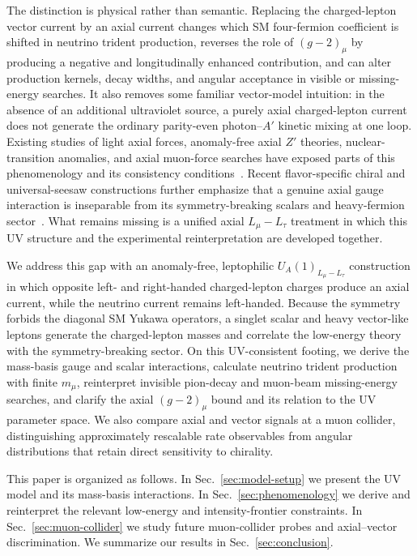 \documentclass[onecolumn, aps, nofootinbib, prd, preprint, floats, floatfix, amsmath, amssymb, superscriptaddress, preprintnumbers]{revtex4-2}
\begin{document}
The distinction is physical rather than semantic. Replacing the charged-lepton vector current by an axial current changes which SM four-fermion coefficient is shifted in neutrino trident production, reverses the role of $(g-2)_\mu$ by producing a negative and longitudinally enhanced contribution, and can alter production kernels, decay widths, and angular acceptance in visible or missing-energy searches. It also removes some familiar vector-model intuition: in the absence of an additional ultraviolet source, a purely axial charged-lepton current does not generate the ordinary parity-even photon--$A'$ kinetic mixing at one loop. Existing studies of light axial forces, anomaly-free axial $Z'$ theories, nuclear-transition anomalies, and axial muon-force searches have exposed parts of this phenomenology and its consistency conditions~\cite{Kahn:2016vjr,Ismail:2016tod,Kozaczuk:2016nma,Hicyilmaz:2022owb,Batell:2011qq,Davoudiasl:2012ag,Fayet:2020bmb,Baruch:2022esd,Fayet:2024ddk,Abbaslu:2024hep,Abbaslu:2025fwt}. Recent flavor-specific chiral and universal-seesaw constructions further emphasize that a genuine axial gauge interaction is inseparable from its symmetry-breaking scalars and heavy-fermion sector~\cite{Prajapati:2026tfv,Dutta:2026dnf}. What remains missing is a unified axial $L_\mu-L_\tau$ treatment in which this UV structure and the experimental reinterpretation are developed together.

We address this gap with an anomaly-free, leptophilic $U_A(1)_{L_\mu-L_\tau}$ construction in which opposite left- and right-handed charged-lepton charges produce an axial current, while the neutrino current remains left-handed. Because the symmetry forbids the diagonal SM Yukawa operators, a singlet scalar and heavy vector-like leptons generate the charged-lepton masses and correlate the low-energy theory with the symmetry-breaking sector. On this UV-consistent footing, we derive the mass-basis gauge and scalar interactions, calculate neutrino trident production with finite $m_\mu$, reinterpret invisible pion-decay and muon-beam missing-energy searches, and clarify the axial $(g-2)_\mu$ bound and its relation to the UV parameter space. We also compare axial and vector signals at a muon collider, distinguishing approximately rescalable rate observables from angular distributions that retain direct sensitivity to chirality.

This paper is organized as follows. In Sec.~\ref{sec:model-setup} we present the UV model and its mass-basis interactions. In Sec.~\ref{sec:phenomenology} we derive and reinterpret the relevant low-energy and intensity-frontier constraints. In Sec.~\ref{sec:muon-collider} we study future muon-collider probes and axial--vector discrimination. We summarize our results in Sec.~\ref{sec:conclusion}.
\end{document}
